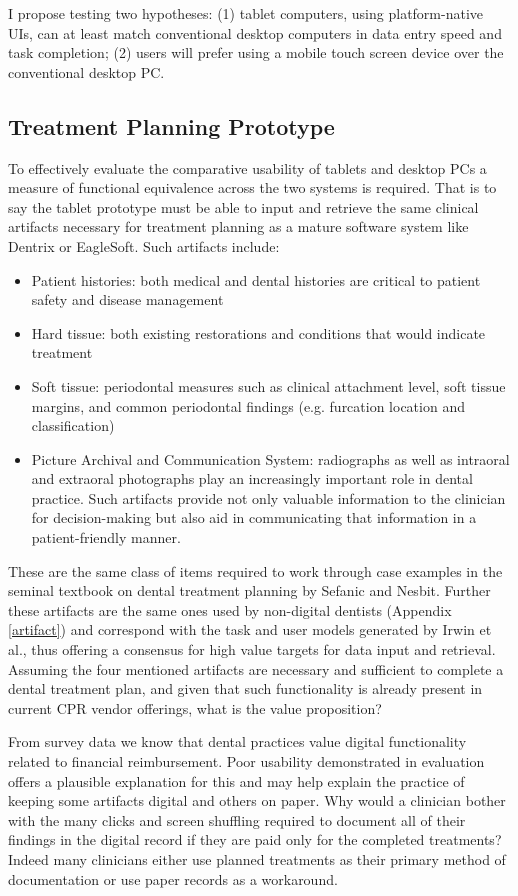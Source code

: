 \documentclass[11pt]{article}
\begin{document}
I propose testing two hypotheses: (1) tablet computers, using platform-native UIs, can at least match conventional desktop computers in data entry speed and task completion; (2) users will prefer using a mobile touch screen device over the conventional desktop PC.

\subsection{Treatment Planning Prototype}

To effectively evaluate the comparative usability of tablets and desktop PCs a measure of functional equivalence across the two systems is required. That is to say the tablet prototype must be able to input and retrieve the same clinical artifacts necessary for treatment planning as a mature software system like Dentrix or EagleSoft. Such artifacts include:
\begin{itemize}
\item Patient histories: both medical and dental histories are critical to patient safety and disease management
\item Hard tissue: both existing restorations and conditions that would indicate treatment
\item Soft tissue: periodontal measures such as clinical attachment level, soft tissue margins, and common periodontal findings (e.g. furcation location and classification)
\item Picture Archival and Communication System: radiographs as well as intraoral and extraoral photographs play an increasingly important role in dental practice. Such artifacts provide not only valuable information to the clinician for decision-making but also aid in communicating that information in a patient-friendly manner.
\end{itemize}
These are the same class of items required to work through case examples in the seminal textbook on dental treatment planning by Sefanic and Nesbit\cite{Stefanac2006Treatment-Plann}. Further these artifacts are the same ones used by non-digital dentists (Appendix \ref{artifact}) and correspond with the task and user models generated by Irwin et al., thus offering a consensus for high value targets for data input and retrieval. Assuming the four mentioned artifacts are necessary and sufficient to complete a dental treatment plan, and given that such functionality is already present in current CPR vendor offerings, what is the value proposition?

From survey data we know that dental practices value digital functionality related to financial reimbursement. Poor usability demonstrated in evaluation offers a plausible explanation for this and may help explain the practice of keeping some artifacts digital and others on paper. Why would a clinician bother with the many clicks and screen shuffling required to document all of their findings in the digital record if they are paid only for the completed treatments? Indeed many clinicians either use planned treatments as their primary method of documentation or use paper records as a workaround. 
\end{document}
